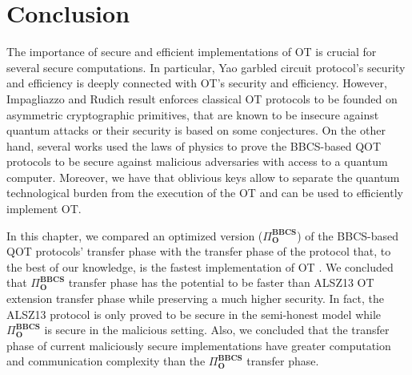 \section{Conclusion}

The importance of secure and efficient implementations of OT is crucial for several secure computations. In particular, Yao garbled circuit protocol's security and efficiency is deeply connected with OT's security and efficiency. However, Impagliazzo and Rudich result enforces classical OT protocols to be founded on asymmetric cryptographic primitives, that are known to be insecure against quantum attacks or their security is based on some conjectures. On the other hand, several works \cite{Lemus20,BCKM21, GLSV21,U10} used the laws of physics to prove the BBCS-based QOT protocols to be secure against malicious adversaries with access to a quantum computer. Moreover, we have that oblivious keys allow to separate the quantum technological burden from the execution of the OT and can be used to efficiently implement OT.

In this chapter, we compared an optimized version ($\Pi^{\textbf{BBCS}}_{\textbf{O}}$) of the BBCS-based QOT protocols' transfer phase with the transfer phase of the protocol that, to the best of our knowledge, is the fastest implementation of OT \cite{ALSZ13}. We concluded that $\Pi^{\textbf{BBCS}}_{\textbf{O}}$ transfer phase has the potential to be faster than ALSZ13 OT extension transfer phase while preserving a much higher security. In fact, the ALSZ13 protocol is only proved to be secure in the semi-honest model while $\Pi^{\textbf{BBCS}}_{\textbf{O}}$ is secure in the malicious setting. Also, we concluded that the transfer phase of current maliciously secure implementations \cite{ALSZ15, KOS15} have greater computation and communication complexity than the $\Pi^{\textbf{BBCS}}_{\textbf{O}}$ transfer phase.

%
%
%
